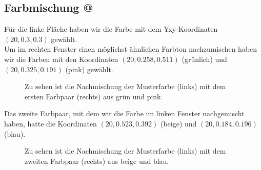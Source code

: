 \documentclass[11pt]{article}
\makeatletter
\newcommand*{\rom}[1]{\expandafter\@slowromancap\romannumeral #1@}
\makeatother
\begin{document}
\subsection{Farbmischung \rom{2}}
Für die linke Fläche haben wir die Farbe mit dem Yxy-Koordinaten $(20,0.3,0.3)$ gewählt. \\
Um im rechten Fenster einen möglichst ähnlichen Farbton nachzumischen haben wir die Farben mit den Koordinaten $(20,0.258, 0.511)$ (grünlich) und $(20,0.325, 0.191)$ (pink) gewählt. 


\begin{figure}[H]
\caption{Zu sehen ist die Nachmischung der Musterfarbe (links) mit dem ersten Farbpaar (rechts) aus grün und pink.}
\label{meta1}
\end{figure}


Das zweite Farbpaar, mit dem wir die Farbe im linken Fenster nachgemischt haben, hatte die Koordinaten $(20,0.523, 0.392)$ (beige) und $(20,0.184, 0.196)$ (blau). 

\begin{figure}[H]
\caption{Zu sehen ist die Nachmischung der Musterfarbe (links) mit dem zweiten Farbpaar (rechts) aus beige und blau.}
\label{meta2}
\end{figure}
\end{document}
